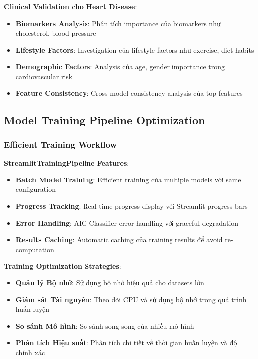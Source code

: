 \textbf{Clinical Validation cho Heart Disease}:
\begin{itemize}
    \item \textbf{Biomarkers Analysis}: Phân tích importance của biomarkers như cholesterol, blood pressure
    \item \textbf{Lifestyle Factors}: Investigation của lifestyle factors như exercise, diet habits
    \item \textbf{Demographic Factors}: Analysis của age, gender importance trong cardiovascular risk
    \item \textbf{Feature Consistency}: Cross-model consistency analysis của top features
\end{itemize}

\subsection{Model Training Pipeline Optimization}\label{subsec:pipeline-optimization}

\subsubsection{Efficient Training Workflow}

\textbf{StreamlitTrainingPipeline Features}:
\begin{itemize}
    \item \textbf{Batch Model Training}: Efficient training của multiple models với same configuration
    \item \textbf{Progress Tracking}: Real-time progress display với Streamlit progress bars
    \item \textbf{Error Handling}: AIO Classifier error handling với graceful degradation
    \item \textbf{Results Caching}: Automatic caching của training results để avoid re-computation
\end{itemize}

\textbf{Training Optimization Strategies}:
\begin{itemize}
    \item \textbf{Quản lý Bộ nhớ}: Sử dụng bộ nhớ hiệu quả cho datasets lớn
    \item \textbf{Giám sát Tài nguyên}: Theo dõi CPU và sử dụng bộ nhớ trong quá trình huấn luyện
    \item \textbf{So sánh Mô hình}: So sánh song song của nhiều mô hình
    \item \textbf{Phân tích Hiệu suất}: Phân tích chi tiết về thời gian huấn luyện và độ chính xác
\end{itemize}

